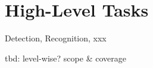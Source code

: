 
\section{High-Level Tasks}
\label{sec:apps}

Detection, Recognition, xxx


tbd: level-wise? scope \& coverage

